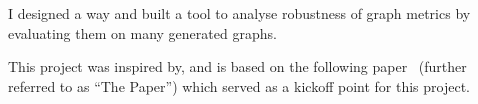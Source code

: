 




I designed a way and built a tool to analyse robustness of graph metrics by evaluating them on many generated graphs.

This project was inspired by, and is based on the following paper~\cite{Bozhilova2019} (further referred to as ``The Paper'') which served as a kickoff point for this project.
\begin{adjustwidth}{1cm}{}
    \vspace*{0.5em}\vspace*{0.5em}
\end{adjustwidth}

